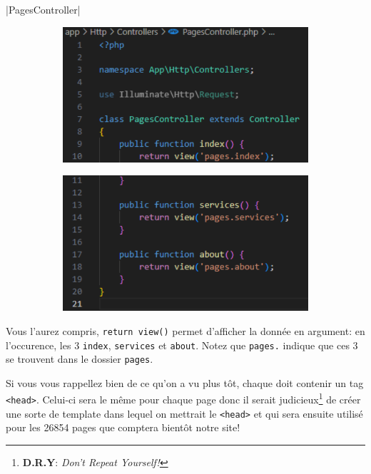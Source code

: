 |PagesController|
\begin{figure}[!h]
    \centering
    \begin{subfigure}{0.49\textwidth}
        \centering
        \includegraphics[width=\textwidth]{figures-C1/pages_controller_1a.pdf}
    \end{subfigure}
    \begin{subfigure}{0.49\textwidth}
        \centering
        \includegraphics[width=\textwidth]{figures-C1/pages_controller_1b.pdf}
    \end{subfigure}
    \caption{\protect{}\label{fig:PagesController1}}
\end{figure}

Vous l'aurez compris, \verb|return view()| permet d'afficher la \view{} donnée en argument: en l'occurence, les 3 \views{} \verb|index|, \verb|services| et \verb|about|. Notez que \verb|pages.| indique que ces 3 \views{} se trouvent dans le dossier \verb|pages|.

\newpage 

Si vous vous rappellez bien de ce qu'on a vu plus tôt, chaque \view{} \html{} doit contenir un tag \verb|<head>|. Celui-ci sera le même pour chaque page donc il serait judicieux\footnote{\textbf{D.R.Y}: \textit{Don't Repeat Yourself!}} de créer une sorte de template dans lequel on mettrait le \verb|<head>| et qui sera ensuite utilisé pour les 26854 pages que comptera bientôt notre site! 

